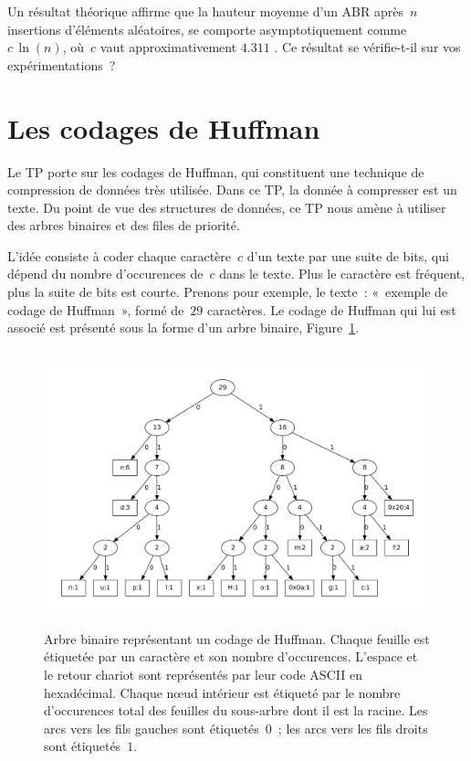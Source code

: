 \documentclass[12pt]{article}
\newcounter{points_counter}
\newcounter{section_points_counter}
\begin{document}
Un résultat théorique affirme que la hauteur moyenne d'un ABR
après~$n$ insertions d'éléments aléatoires, se comporte asymptotiquement
comme~$c \, \ln(n)$, où~$c$ vaut approximativement $4.311$
\cite[Theorem 5.10, page 261]{SF96}.
Ce résultat se vérifie-t-il sur vos expérimentations~?

\section{Les codages de Huffman}\label{sec2}

Le TP porte sur les codages de Huffman, qui constituent une 
technique de compression de données très utilisée.
Dans ce TP, la donnée à compresser est un texte.
Du point de vue des structures de données, ce TP nous amène à
utiliser des arbres binaires et des files de priorité.

L'idée consiste à coder chaque caractère~$c$ d'un texte 
par une suite de bits, qui dépend du nombre d'occurences de~$c$ dans le
texte. Plus le caractère est fréquent, plus la suite de bits est courte.
Prenons pour exemple, le texte~: «~exemple de codage de Huffman~», formé
de~$29$ caractères. Le codage de Huffman qui lui est associé est présenté
sous la forme d'un arbre binaire, Figure~\ref{fig-ex}.

\begin{figure}[h!t]
\centerline{\includegraphics[height=8cm]{exemple.pdf}}
\caption{\footnotesize Arbre binaire représentant un codage de Huffman. 
Chaque feuille est étiquetée par un caractère et son nombre d'occurences.
L'espace et le retour chariot sont représentés par leur code ASCII en
hexadécimal. Chaque nœud intérieur est étiqueté par le nombre d'occurences
total des feuilles du sous-arbre dont il est la racine. Les arcs vers les
fils gauches sont étiquetés~$0$~; les arcs vers les fils droits sont 
étiquetés~$1$.}
\label{fig-ex}
\end{figure}
\end{document}
